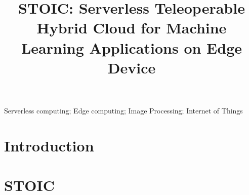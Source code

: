 \documentclass[10pt, conference, compsocconf]{IEEEtran}
\begin{document}
\title{STOIC: Serverless Teleoperable Hybrid Cloud for Machine Learning Applications on Edge Device}

\author{
}




\maketitle

\begin{abstract}
\label{sec:abstract}

\end{abstract}

\begin{IEEEkeywords}
Serverless computing; Edge computing; Image Processing; Internet of Things
\end{IEEEkeywords}


%
\IEEEpeerreviewmaketitle

\section{Introduction}
\label{sec:intro}


%

\section{STOIC}
\label{sec:STOIC}

\end{document}
